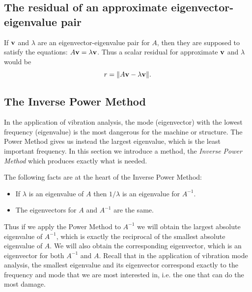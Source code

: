 \subsection*{The residual of an approximate eigenvector-eigenvalue pair}

If $\mathbf{v}$ and $\lambda$ are an eigenvector-eigenvalue pair for $A$, then they are supposed to 
satisfy the equations: $A \mathbf{v} = \lambda \mathbf{v}$. Thus a scalar residual for approximate
 $\mathbf{v}$ and $\lambda$ would be
$$
        r  = \| A \mathbf{v}  - \lambda \mathbf{v} \|.
$$





\subsection*{The Inverse Power Method}

In the application of vibration analysis,  the mode (eigenvector) with
the lowest frequency (eigenvalue) is the most dangerous for
the machine or structure. The Power Method gives us instead
the largest eigenvalue, which is the least important frequency.
In this section we introduce a method, the {\em Inverse
Power Method} which produces exactly what is needed.


The following facts are at the heart of the Inverse Power Method:
\begin{itemize}
\item  If $\lambda$ is an eigenvalue  of $A$ then $1/\lambda$ is an eigenvalue
for $A^{-1}$.
\item The eigenvectors for $A$ and $A^{-1}$ are the same.
\end{itemize}


Thus if we apply the Power Method to $A^{-1}$ we will obtain the largest
absolute eigenvalue of $A^{-1}$, which is exactly the reciprocal of the smallest
absolute eigenvalue of $A$. We will also obtain the corresponding eigenvector, which is
an eigenvector  for both $A^{-1}$ and $A$. Recall that in the application of
vibration mode analysis, the smallest eigenvalue and its eigenvector correspond exactly to
the frequency and mode that we are most interested in, i.e. the one
that can do the most damage.

